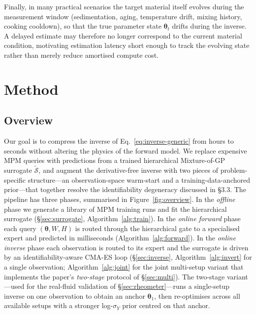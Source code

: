 Finally, in many practical scenarios the target material itself
evolves during the measurement window (sedimentation, aging,
temperature drift, mixing history, cooking cooldown), so that the
true parameter state $\boldsymbol{\theta}_{t}$ drifts during the
inverse. A delayed estimate may therefore no longer correspond to the
current material condition, motivating estimation latency short
enough to track the evolving state rather than merely reduce
amortised compute cost.

\section{Method}
\label{sec:method}

\subsection{Overview}

Our goal is to compress the inverse of
Eq.~\eqref{eq:inverse-generic} from hours to seconds without altering
the physics of the forward model. We replace expensive MPM queries
with predictions from a trained hierarchical Mixture-of-GP surrogate
$\tilde{\mathcal{S}}$, and augment the derivative-free inverse with
two pieces of problem-specific structure---an observation-space
warm-start and a training-data-anchored prior---that together resolve
the identifiability degeneracy discussed in \S3.3. The pipeline has
three phases, summarised in Figure~\ref{fig:overview}. In the
\emph{offline} phase we generate a library of MPM training runs and
fit the hierarchical surrogate (\S\ref{sec:surrogate},
Algorithm~\ref{alg:train}). In the \emph{online forward} phase
each query $(\boldsymbol{\theta}, W, H)$ is routed through the
hierarchical gate to a specialised expert and predicted in
milliseconds (Algorithm~\ref{alg:forward}). In the
\emph{online inverse} phase each observation is routed to its
expert and the surrogate is driven by an identifiability-aware
CMA-ES loop (\S\ref{sec:inverse}, Algorithm~\ref{alg:invert}
for a single observation; Algorithm~\ref{alg:joint} for the joint
multi-setup variant that implements the paper's
\emph{two-stage} protocol of \S\ref{sec:multi}). The two-stage
variant---used for the real-fluid validation of
\S\ref{sec:rheometer}---runs a single-setup inverse on one
observation to obtain an anchor $\boldsymbol{\theta}_{1}$, then
re-optimises across all available setups with a stronger
log-$\sigma_{Y}$ prior centred on that anchor.

